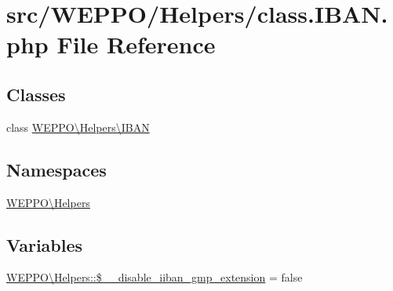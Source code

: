 \hypertarget{class_8IBAN_8php}{}\section{src/\+W\+E\+P\+P\+O/\+Helpers/class.I\+B\+A\+N.\+php File Reference}
\label{class_8IBAN_8php}
\subsection*{Classes}
\begin{DoxyCompactItemize}
\item 
class \hyperlink{classWEPPO_1_1Helpers_1_1IBAN}{W\+E\+P\+P\+O\textbackslash{}\+Helpers\textbackslash{}\+I\+B\+AN}
\end{DoxyCompactItemize}
\subsection*{Namespaces}
\begin{DoxyCompactItemize}
\item 
 \hyperlink{namespaceWEPPO_1_1Helpers}{W\+E\+P\+P\+O\textbackslash{}\+Helpers}
\end{DoxyCompactItemize}
\subsection*{Variables}
\begin{DoxyCompactItemize}
\item 
\hyperlink{namespaceWEPPO_1_1Helpers_a49c50fb06101e7cfd87655a663808c54}{W\+E\+P\+P\+O\textbackslash{}\+Helpers\+::\$\+\_\+\+\_\+disable\+\_\+iiban\+\_\+gmp\+\_\+extension} = false
\end{DoxyCompactItemize}
